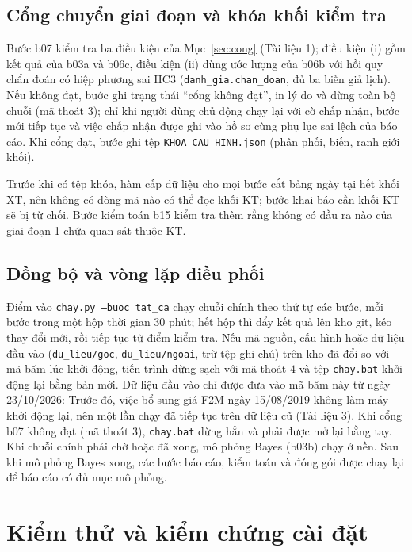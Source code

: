 \documentclass[12pt,a4paper]{article}
\theoremstyle{remark}
\newcommand{\ma}[1]{\texttt{\small #1}}
\newcommand{\XT}{\mathrm{XT}}
\newcommand{\KT}{\mathrm{KT}}
\begin{document}
\subsection{Cổng chuyển giai đoạn và khóa khối kiểm tra}

Bước b07 kiểm tra ba điều kiện của Mục~\ref{sec:cong} (Tài liệu 1); điều kiện (i) gồm kết quả của b03a và b06c, điều kiện (ii) dùng ước lượng của b06b với hồi quy chẩn đoán có hiệp phương sai HC3 (\ma{danh\_gia.chan\_doan}, đủ ba biến giả lịch). Nếu không đạt, bước ghi trạng thái ``cổng không đạt'', in lý do và dừng toàn bộ chuỗi (mã thoát $3$); chỉ khi người dùng chủ động chạy lại với cờ chấp nhận, bước mới tiếp tục và việc chấp nhận được ghi vào hồ sơ cùng phụ lục sai lệch của báo cáo. Khi cổng đạt, bước ghi tệp \ma{KHOA\_CAU\_HINH.json} (phân phối, biến, ranh giới khối).

Trước khi có tệp khóa, hàm cấp dữ liệu cho mọi bước cắt bảng ngày tại hết khối $\XT$, nên không có dòng mã nào có thể đọc khối $\KT$; bước khai báo cần khối $\KT$ sẽ bị từ chối. Bước kiểm toán b15 kiểm tra thêm rằng không có đầu ra nào của giai đoạn 1 chứa quan sát thuộc $\KT$.

\subsection{Đồng bộ và vòng lặp điều phối}

Điểm vào \ma{chay.py --buoc tat\_ca} chạy chuỗi chính theo thứ tự các bước, mỗi bước trong một hộp thời gian $30$ phút; hết hộp thì đẩy kết quả lên kho git, kéo thay đổi mới, rồi tiếp tục từ điểm kiểm tra. Nếu mã nguồn, cấu hình hoặc dữ liệu đầu vào (\ma{du\_lieu/goc}, \ma{du\_lieu/ngoai}, trừ tệp ghi chú) trên kho đã đổi so với mã băm lúc khởi động, tiến trình dừng sạch với mã thoát $4$ và tệp \ma{chay.bat} khởi động lại bằng bản mới. Dữ liệu đầu vào chỉ được đưa vào mã băm này từ ngày 23/10/2026: Trước đó, việc bổ sung giá F2M ngày 15/08/2019 không làm máy khởi động lại, nên một lần chạy đã tiếp tục trên dữ liệu cũ (Tài liệu 3). Khi cổng b07 không đạt (mã thoát $3$), \ma{chay.bat} dừng hẳn và phải được mở lại bằng tay. Khi chuỗi chính phải chờ hoặc đã xong, mô phỏng Bayes (b03b) chạy ở nền. Sau khi mô phỏng Bayes xong, các bước báo cáo, kiểm toán và đóng gói được chạy lại để báo cáo có đủ mục mô phỏng.

\section{Kiểm thử và kiểm chứng cài đặt}\label{sec:kiemthu}
\end{document}

